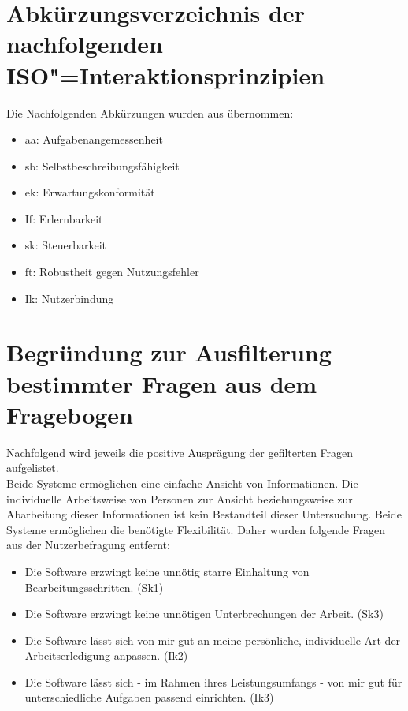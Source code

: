 

\section{Abkürzungsverzeichnis der nachfolgenden ISO"=Interaktionsprinzipien}
\label{Add:Nutzerbefragung_Prümper:ISO-Abkürzungen}
Die Nachfolgenden Abkürzungen wurden aus \cite{Pruemper:Fragebogen-S:2006} übernommen: %
\begin{itemize}
    \item aa: Aufgabenangemessenheit
    \item sb: Selbstbeschreibungsfähigkeit
    \item ek: Erwartungskonformität
    \item If: Erlernbarkeit
    \item sk: Steuerbarkeit
    \item ft: Robustheit gegen Nutzungsfehler
    \item Ik: Nutzerbindung
\end{itemize}

\section{Begründung zur Ausfilterung bestimmter Fragen aus dem Fragebogen \cite{Pruemper:Fragebogen-S:2006}}
\label{Add:Nutzerbefragung_Prümper:Begründung_Filterung}

Nachfolgend wird jeweils die positive Ausprägung der gefilterten Fragen aufgelistet.\\

\noindent
Beide Systeme ermöglichen eine einfache Ansicht von Informationen. Die individuelle Arbeitsweise von Personen zur Ansicht beziehungsweise zur Abarbeitung dieser Informationen ist kein Bestandteil dieser Untersuchung.
Beide Systeme ermöglichen die benötigte Flexibilität. Daher wurden folgende Fragen aus der Nutzerbefragung entfernt:
\begin{itemize}
    \item Die Software erzwingt keine unnötig starre Einhaltung von Bearbeitungsschritten. (Sk1) %
    \item Die Software erzwingt keine unnötigen Unterbrechungen der Arbeit. (Sk3) %
    \item Die Software lässt sich von mir gut an meine persönliche, individuelle Art der Arbeitserledigung anpassen. (Ik2) %
    \item Die Software lässt sich - im Rahmen ihres Leistungsumfangs - von mir gut für unterschiedliche Aufgaben passend einrichten. (Ik3) %
\end{itemize}

